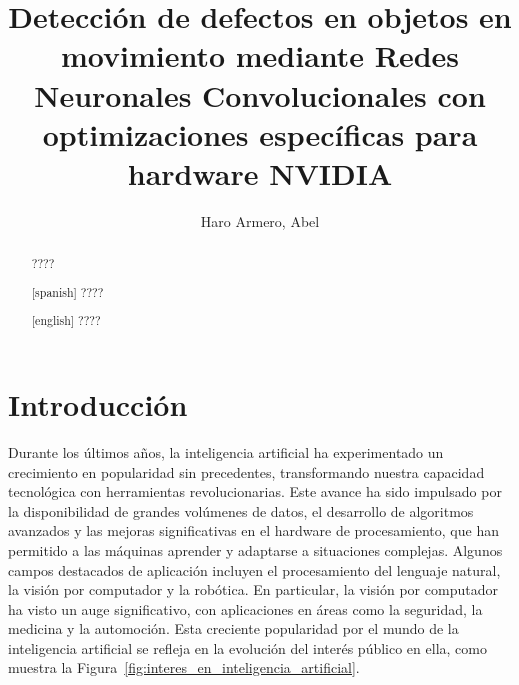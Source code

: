 \documentclass[11pt,spanish,listoffigures,listoftables]{tfgetsinf}
\title{Detección de defectos en objetos en movimiento mediante Redes Neuronales Convolucionales con optimizaciones específicas para hardware NVIDIA}
\author{Haro Armero, Abel}
\begin{document}

\begin{abstract}
????
\end{abstract}
\begin{abstract}[spanish]
????
\end{abstract}
\begin{abstract}[english]
????
\end{abstract}


\mainmatter


\chapter{Introducci\'on}
Durante los últimos años, la inteligencia artificial ha experimentado un crecimiento en popularidad sin precedentes, transformando nuestra capacidad tecnológica con herramientas revolucionarias. Este avance ha sido impulsado por la disponibilidad de grandes volúmenes de datos, el desarrollo de algoritmos avanzados y las mejoras significativas en el hardware de procesamiento, que han permitido a las máquinas aprender y adaptarse a situaciones complejas. Algunos campos destacados de aplicación incluyen el procesamiento del lenguaje natural, la visión por computador y la robótica. En particular, la visión por computador ha visto un auge significativo, con aplicaciones en áreas como la seguridad, la medicina y la automoción. Esta creciente popularidad por el mundo de la inteligencia artificial se refleja en la evolución del interés público en ella, como muestra la Figura~\ref{fig:interes_en_inteligencia_artificial}.
\end{document}
